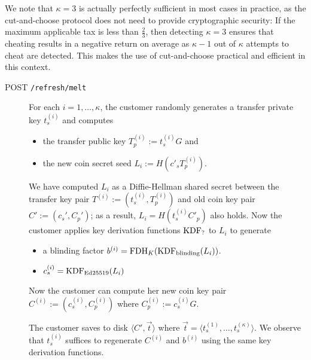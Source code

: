 \documentclass{llncs}
\begin{document}
We note that $\kappa = 3$ is actually perfectly sufficient in most
cases in practice, as the cut-and-choose protocol does not need to
provide cryptographic security: If the maximum applicable tax is less
than $\frac{2}{3}$, then detecting $\kappa = 3$ ensures that cheating
results in a negative return on average as $\kappa - 1$ out of
$\kappa$ attempts to cheat are detected.  This makes the use of
cut-and-choose practical and efficient in this context.


\begin{description}
  \item[POST {\tt /refresh/melt}]
    For each $i = 1,\ldots,\kappa$, the customer randomly generates
    a transfer private key $t^{(i)}_s$ and computes
    \begin{itemize}
    \item the transfer public key $T^{(i)}_p := t^{(i)}_s G$ and
    \item the new coin secret seed $L_i := H(c'_s T_p^{(i)})$.
    \end{itemize}
    We have computed $L_i$ as a Diffie-Hellman shared secret between
    the transfer key pair $T^{(i)} := \left(t^{(i)}_s,T^{(i)}_p\right)$
    and old coin key pair $C' := \left(c_s', C_p'\right)$;
    as a result, $L_i = H(t^{(i)}_s C'_p)$ also holds.
    Now the customer applies key derivation functions $\textrm{KDF}_?$ to $L_i$ to generate
    \begin{itemize}
      \item a blinding factor $b^{(i)} = \textrm{FDH}_K(\textrm{KDF}_{\textrm{blinding}}(L_i))$.
      \item $c_s^{(i)} = \textrm{KDF}_{\textrm{Ed25519}}(L_i)$
    \end{itemize}
    Now the customer can compute her new coin key pair
     $C^{(i)} := \left(c_s^{(i)}, C_p^{(i)}\right)$
     where $C^{(i)}_p := c^{(i)}_s G$.

    The customer saves to disk $\langle C', \vec{t}\rangle$ where
    $\vec{t} = \langle t^{(1)}_s, \ldots, t^{(\kappa)}_s \rangle$.
    We observe that $t^{(i)}_s$ suffices to regenerate $C^{(i)}$ and $b^{(i)}$
    using the same key derivation functions.


\end{description}
\end{document}
